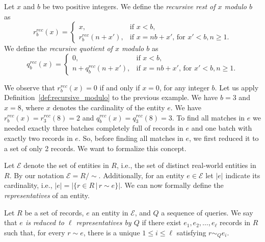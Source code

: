 \documentclass[sigconf, nonacm]{acmart}
\begin{document}
\begin{definition}\label{def:recursive_modulo}
    Let $x$ and $b$ be two positive integers. We define the \emph{recursive rest of $x$ modulo $b$} as
    \begin{equation}
        r^{rec}_b(x) = 
        \begin{cases}
            x, &\text{if $x < b$,}\\
            r^{rec}_b(n+x'), &\text{if $x = nb+x'$, for $x'<b, n\geq1$.}
        \end{cases}
    \end{equation}
We define the \emph{recursive quotient of $x$ modulo $b$} as
    \begin{equation}
        q^{rec}_b(x) = 
        \begin{cases}
            0, &\text{if $x<b$,}\\
            n+q^{rec}_b(n+x'), &\text{if $x = nb+x'$, for $x'<b, n\geq1$.}
        \end{cases}
    \end{equation}
\end{definition}

We observe that $r^{rec}_b(x) = 0$ if and only if $x=0$, for any integer $b$. Let us apply Definition~\ref{def:recursive_modulo} to the previous example. 
We have $b=3$ and $x = 8$, where $x$ denotes the cardinality of the entity $e$. We have $r^{rec}_b(x) = r^{rec}_3(8) = 2$ and $q^{rec}_b(x) = q^{rec}_3(8) = 3$. 
To find all matches in $e$ we needed exactly three batches completely full of records in $e$ and one batch with exactly two records in $e$. So, before finding all matches in $e$, we first reduced it to a set of only 2 records. We want to formalize this concept.

Let $\mathcal{E}$ denote the set of entities in $R$, i.e., the set of distinct real-world entities in $R$. By our notation $\mathcal{E}=R/\sim$. Additionally, for an entity $e\in\mathcal{E}$ let $|e|$ indicate its cardinality, i.e., $|e| = |\{r\in R \,|\, r\sim e\}|$. We can now formally define the \emph{representatives} of an entity.


\begin{definition}\label{def:reduction}
    Let $R$ be a set of records, $e$ an entity in $\mathcal{E}$, and $Q$ a sequence of queries. We say that \emph{$e$ is reduced to $\ell$ representatives by $Q$} if there exist $e_1, e_2,\ldots, e_\ell$ records in $R$ such that, for every $r\sim e$, there is a unique $1\leq i\leq \ell$ satisfying $r \sim_Q e_i$.
\end{definition}
\end{document}

